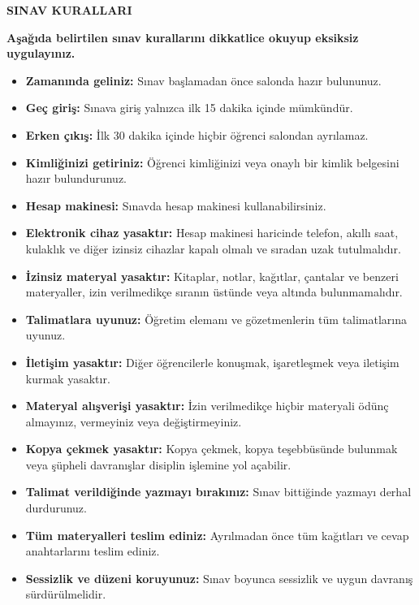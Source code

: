 \documentclass[12pt,a4paper]{exam}
\newlength{\ContentTopOffset}
\begin{document}
\vspace*{\ContentTopOffset}

{\small
\vspace{0.3cm}
\begin{center}
\textbf{SINAV KURALLARI}
\end{center}
\vspace{0.1cm}
\noindent\textbf{Aşağıda belirtilen sınav kurallarını dikkatlice okuyup eksiksiz uygulayınız.}
\vspace{-0.1cm}
\begin{itemize}\setlength{\itemsep}{0pt}\setlength{\parskip}{0pt}\setlength{\parsep}{0pt}
    
    \item \textbf{Zamanında geliniz:} Sınav başlamadan önce salonda hazır bulununuz.
    \item \textbf{Geç giriş:} Sınava giriş yalnızca ilk 15 dakika içinde mümkündür.
    \item \textbf{Erken çıkış:} İlk 30 dakika içinde hiçbir öğrenci salondan ayrılamaz.
    \item \textbf{Kimliğinizi getiriniz:} Öğrenci kimliğinizi veya onaylı bir kimlik belgesini hazır bulundurunuz.
    \item \textbf{Hesap makinesi:} Sınavda hesap makinesi kullanabilirsiniz.
    \item \textbf{Elektronik cihaz yasaktır:} Hesap makinesi haricinde telefon, akıllı saat, kulaklık ve diğer izinsiz cihazlar kapalı olmalı ve sıradan uzak tutulmalıdır.
    \item \textbf{İzinsiz materyal yasaktır:} Kitaplar, notlar, kağıtlar, çantalar ve benzeri materyaller, izin verilmedikçe sıranın üstünde veya altında bulunmamalıdır.
    \item \textbf{Talimatlara uyunuz:} Öğretim elemanı ve gözetmenlerin tüm talimatlarına uyunuz.
    \item \textbf{İletişim yasaktır:} Diğer öğrencilerle konuşmak, işaretleşmek veya iletişim kurmak yasaktır.
    \item \textbf{Materyal alışverişi yasaktır:} İzin verilmedikçe hiçbir materyali ödünç almayınız, vermeyiniz veya değiştirmeyiniz.
    \item \textbf{Kopya çekmek yasaktır:} Kopya çekmek, kopya teşebbüsünde bulunmak veya şüpheli davranışlar disiplin işlemine yol açabilir.
    \item \textbf{Talimat verildiğinde yazmayı bırakınız:} Sınav bittiğinde yazmayı derhal durdurunuz.
    \item \textbf{Tüm materyalleri teslim ediniz:} Ayrılmadan önce tüm kağıtları ve cevap anahtarlarını teslim ediniz.
    \item \textbf{Sessizlik ve düzeni koruyunuz:} Sınav boyunca sessizlik ve uygun davranış sürdürülmelidir.
\end{itemize}

}
\end{document}
